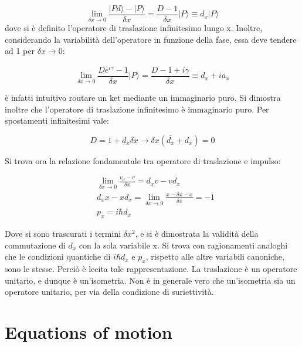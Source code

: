 \documentclass{article}
\begin{document}
\begin{equation}
  \lim_{\delta x \rightarrow 0} \frac{|Pd\rangle -|P\rangle }{\delta x}= \frac{D-1}{\delta x}|P\rangle \equiv d_x |P\rangle
\end{equation}
dove si è definito l'operatore di traslazione infinitesimo lungo x.
Inoltre, considerando la variabilità dell'operatore in funzione della fase, essa deve tendere ad 1 per $\delta x \rightarrow 0$:

\begin{equation}
  \lim_{\delta x \rightarrow 0} \frac{De^{i\gamma}-1}{\delta x}|P\rangle = \frac{D-1+i\gamma}{\delta x}\equiv d_x+ia_x
\end{equation}

è infatti intuitivo routare un ket mediante un immaginario puro.
Si dimostra inoltre che l'operatore di traslazione infinitesimo è immaginario puro.
Per spostamenti infinitesimi vale:

\begin{equation}
  D= 1+d_x\delta x \rightarrow \delta x (\bar{d_x}+d_x)=0
\end{equation}

Si trova ora la relazione fondamentale tra operatore di traslazione e impulso:

\begin{equation}
  \begin{aligned}
     & \lim_{\delta x \rightarrow 0} \frac{v_d-v}{\delta x}= d_xv-vd_x               \\
     & d_x x- xd_x= \lim_{\delta x \rightarrow 0} \frac{x-\delta x -x}{\delta x}= -1 \\
     & p_x= i\hbar d_x
  \end{aligned}
\end{equation}

Dove si sono trascurati i termini $\delta x^2$, e si è dimostrata la validità della commutazione di $d_x$ con la sola variabile x.
Si trova con ragionamenti analoghi che le condizioni quantiche di $i\hbar d_x$ e $p_x$, rispetto alle altre variabili canoniche, sono le stesse.
Perciò è lecita tale rappresentazione.
La traslazione è un operatore unitario, e dunque è un'isometria. Non è in generale vero che un'isometria sia un operatore unitario, per via
della condizione di suriettività.


\section{Equations of motion}
\end{document}
